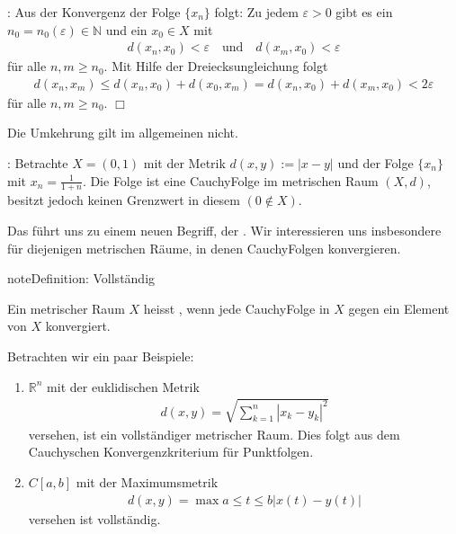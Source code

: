 \documentclass[letterpaper,10pt,english]{jupyterBook}
\begin{document}
: Aus der Konvergenz der Folge \(\{x_n\}\) folgt: Zu jedem \(\varepsilon>0\) gibt es ein \(n_0 = n_0(\varepsilon)\in\mathbb{N}\) und ein \(x_0\in X\) mit
\begin{equation*}
\begin{split}d(x_n,x_0) < \varepsilon\quad\text{und}\quad d(x_m,x_0) < \varepsilon\end{split}
\end{equation*}
für alle \(n,m \ge n_0\). Mit Hilfe der Dreiecksungleichung folgt
\begin{equation*}
\begin{split}d(x_n,x_m) \le d(x_n,x_0) + d(x_0,x_m) = d(x_n,x_0) + d(x_m,x_0) < 2 \varepsilon\end{split}
\end{equation*}
für alle \(n,m \ge n_0\). \(\Box\)

Die Umkehrung gilt im allgemeinen nicht.

: Betrachte \(X = (0,1)\) mit der Metrik \(d(x,y) := |x-y|\) und der Folge \(\{x_n\}\) mit \(x_n = \frac{1}{1+n}\). Die Folge ist eine Cauchy\sphinxhyphen{}Folge im metrischen Raum \((X,d)\), besitzt jedoch keinen Grenzwert in diesem \((0\not\in X)\).

Das führt uns zu einem neuen Begriff, der . Wir interessieren uns insbesondere für diejenigen metrischen Räume, in denen Cauchy\sphinxhyphen{}Folgen konvergieren.

\begin{sphinxadmonition}{note}{Definition: Vollständig}

Ein metrischer Raum \(X\) heisst , wenn jede Cauchy\sphinxhyphen{}Folge in \(X\) gegen ein Element von \(X\) konvergiert.
\end{sphinxadmonition}

Betrachten wir ein paar Beispiele:
\begin{enumerate}
%
\item {} 
\(\mathbb{R}^n\) mit der euklidischen Metrik
\begin{equation*}
\begin{split}d(x,y) = \sqrt{\sum_{k=1}^n |x_k-y_k|^2}\end{split}
\end{equation*}
versehen, ist ein vollständiger metrischer Raum. Dies folgt aus dem Cauchyschen Konvergenzkriterium für Punktfolgen.

\item {} 
\(C[a,b]\) mit der Maximumsmetrik
\begin{equation*}
\begin{split}d(x,y) = \max{a\le t\le b} |x(t)-y(t)|\end{split}
\end{equation*}
versehen ist vollständig.

\end{enumerate}
\end{document}
